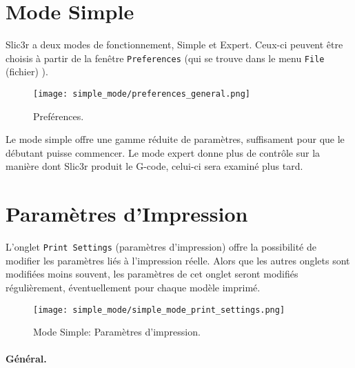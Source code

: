 \section{Mode Simple} %
\label{sec:simple_mode}

Slic3r a deux modes de fonctionnement, Simple et Expert. Ceux-ci peuvent \^etre choisis \`a partir de la fen\^etre \texttt{Preferences} (qui se trouve dans le menu  \texttt{File} (fichier) ).

\begin{figure}[ht]
\centering
\texttt{[image: simple\_mode/preferences\_general.png]}
\caption{Pref\'erences.}
\label{fig:preferences_general}
\end{figure}

Le mode simple offre une gamme r\'eduite de param\`etres, suffisament pour que le d\'ebutant puisse commencer. Le mode expert donne plus de contr\^ole sur la mani\`ere dont Slic3r produit le G-code, celui-ci sera examin\'e plus tard.

\section{Param\`etres d'Impression}

L'onglet \texttt{Print Settings} (param\`etres d'impression) 
offre la possibilit\'e de modifier les param\`etres li\'es \`a l'impression r\'eelle. Alors que les autres onglets sont modifi\'ees moins souvent, les param\`etres de cet onglet seront modifi\'es r\'eguli\`erement, \'eventuellement pour chaque mod\`ele imprim\'e.

\begin{figure}[ht]
\centering
\texttt{[image: simple\_mode/simple\_mode\_print\_settings.png]}
\caption{Mode Simple: Param\`etres d'impression.}
\label{fig:simple_mode_print_settings}
\end{figure}

\paragraph{G\'en\'eral.} %
\label{par:simple_general}

